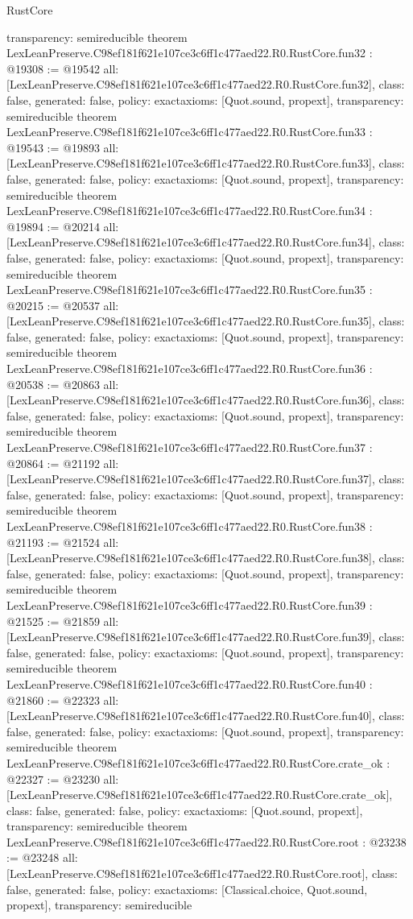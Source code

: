 \begin{lexlean}{RustCore}
\begin{coremodule}
{  transparency: semireducible
}
theorem LexLeanPreserve.C98ef181f621e107ce3c6ff1c477aed22.R0.RustCore.fun32 : @19308 := @19542 {
  all: [LexLeanPreserve.C98ef181f621e107ce3c6ff1c477aed22.R0.RustCore.fun32],
  class: false,
  generated: false,
  policy: exact{axioms: [Quot.sound, propext]},
  transparency: semireducible
}
theorem LexLeanPreserve.C98ef181f621e107ce3c6ff1c477aed22.R0.RustCore.fun33 : @19543 := @19893 {
  all: [LexLeanPreserve.C98ef181f621e107ce3c6ff1c477aed22.R0.RustCore.fun33],
  class: false,
  generated: false,
  policy: exact{axioms: [Quot.sound, propext]},
  transparency: semireducible
}
theorem LexLeanPreserve.C98ef181f621e107ce3c6ff1c477aed22.R0.RustCore.fun34 : @19894 := @20214 {
  all: [LexLeanPreserve.C98ef181f621e107ce3c6ff1c477aed22.R0.RustCore.fun34],
  class: false,
  generated: false,
  policy: exact{axioms: [Quot.sound, propext]},
  transparency: semireducible
}
theorem LexLeanPreserve.C98ef181f621e107ce3c6ff1c477aed22.R0.RustCore.fun35 : @20215 := @20537 {
  all: [LexLeanPreserve.C98ef181f621e107ce3c6ff1c477aed22.R0.RustCore.fun35],
  class: false,
  generated: false,
  policy: exact{axioms: [Quot.sound, propext]},
  transparency: semireducible
}
theorem LexLeanPreserve.C98ef181f621e107ce3c6ff1c477aed22.R0.RustCore.fun36 : @20538 := @20863 {
  all: [LexLeanPreserve.C98ef181f621e107ce3c6ff1c477aed22.R0.RustCore.fun36],
  class: false,
  generated: false,
  policy: exact{axioms: [Quot.sound, propext]},
  transparency: semireducible
}
theorem LexLeanPreserve.C98ef181f621e107ce3c6ff1c477aed22.R0.RustCore.fun37 : @20864 := @21192 {
  all: [LexLeanPreserve.C98ef181f621e107ce3c6ff1c477aed22.R0.RustCore.fun37],
  class: false,
  generated: false,
  policy: exact{axioms: [Quot.sound, propext]},
  transparency: semireducible
}
theorem LexLeanPreserve.C98ef181f621e107ce3c6ff1c477aed22.R0.RustCore.fun38 : @21193 := @21524 {
  all: [LexLeanPreserve.C98ef181f621e107ce3c6ff1c477aed22.R0.RustCore.fun38],
  class: false,
  generated: false,
  policy: exact{axioms: [Quot.sound, propext]},
  transparency: semireducible
}
theorem LexLeanPreserve.C98ef181f621e107ce3c6ff1c477aed22.R0.RustCore.fun39 : @21525 := @21859 {
  all: [LexLeanPreserve.C98ef181f621e107ce3c6ff1c477aed22.R0.RustCore.fun39],
  class: false,
  generated: false,
  policy: exact{axioms: [Quot.sound, propext]},
  transparency: semireducible
}
theorem LexLeanPreserve.C98ef181f621e107ce3c6ff1c477aed22.R0.RustCore.fun40 : @21860 := @22323 {
  all: [LexLeanPreserve.C98ef181f621e107ce3c6ff1c477aed22.R0.RustCore.fun40],
  class: false,
  generated: false,
  policy: exact{axioms: [Quot.sound, propext]},
  transparency: semireducible
}
theorem LexLeanPreserve.C98ef181f621e107ce3c6ff1c477aed22.R0.RustCore.crate_ok : @22327 := @23230 {
  all: [LexLeanPreserve.C98ef181f621e107ce3c6ff1c477aed22.R0.RustCore.crate_ok],
  class: false,
  generated: false,
  policy: exact{axioms: [Quot.sound, propext]},
  transparency: semireducible
}
theorem LexLeanPreserve.C98ef181f621e107ce3c6ff1c477aed22.R0.RustCore.root : @23238 := @23248 {
  all: [LexLeanPreserve.C98ef181f621e107ce3c6ff1c477aed22.R0.RustCore.root],
  class: false,
  generated: false,
  policy: exact{axioms: [Classical.choice, Quot.sound, propext]},
  transparency: semireducible
}


\end{coremodule}
\end{lexlean}
